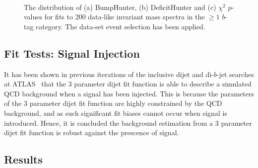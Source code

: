 \begin{figure}[!htb]
\begin{center}
  \\
  \end{center}
  \caption{The distribution of (a) BumpHunter, (b) DeficitHunter and (c) $\chi^{2}$ \mbox{$p$-value}s for fits to
    200 data-like invariant mass spectra in the $\geq1$ $b$-tag category.
    The \summer{} data-set event selection has been applied.}
  \label{fig:pValueHists_bj}
\end{figure}


\subsection{Fit Tests: Signal Injection}
\label{sec:bkg-summer_sigInj}

It has been shown in previous iterations of the inclusive dijet and di-$b$-jet searches at ATLAS~\cite{dijet-mori16_paper,dibjet-mori16_paper}
that the 3 parameter dijet fit function is able to describe a simulated QCD background when a signal has been injected.
This is because the parameters of the 3 parameter dijet fit function are highly constrained by the QCD background,
and as such significant fit biases cannot occur when signal is introduced.
Hence, it is concluded the background estimation from a 3 parameter dijet fit function is robust against the prescence of signal.

\FloatBarrier

\subsection{Results}
\label{sec:bkg-summer_results}

